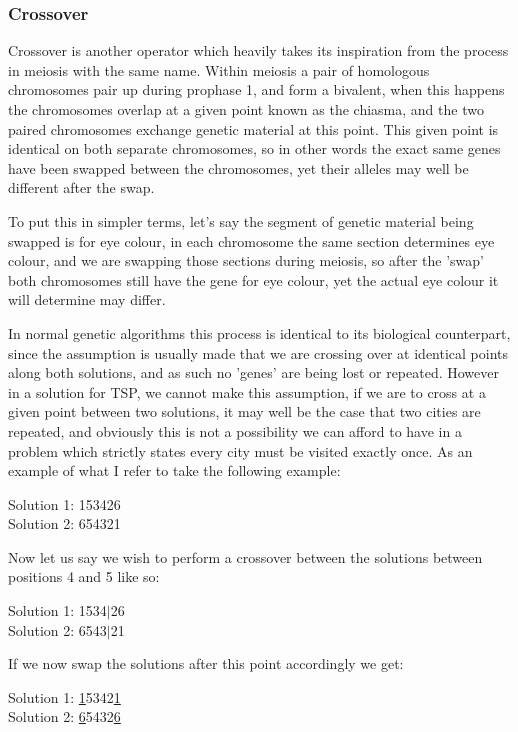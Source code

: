 \documentclass[11pt,a4paper,titlepage]{article}
\begin{document}
\subsubsection{Crossover}

Crossover is another operator which heavily takes its inspiration from the process in meiosis with the same name. Within meiosis a pair of homologous chromosomes pair up during prophase 1, and form a bivalent, when this happens the chromosomes overlap at a given point known as the chiasma, and the two paired chromosomes exchange genetic material at this point. This given point is identical on both separate chromosomes, so in other words the exact same genes have been swapped between the chromosomes, yet their alleles may well be different after the swap.

To put this in simpler terms, let's say the segment of genetic material being swapped is for eye colour, in each chromosome the same section determines eye colour, and we are swapping those sections during meiosis, so after the 'swap' both chromosomes still have the gene for eye colour, yet the actual eye colour it will determine may differ.

In normal genetic algorithms this process is identical to its biological counterpart, since the assumption is usually made that we are crossing over at identical points along both solutions, and as such no 'genes' are being lost or repeated. However in a solution for TSP, we cannot make this assumption, if we are to cross at a given point between two solutions, it may well be the case that two cities are repeated, and obviously this is not a possibility we can afford to have in a problem which strictly states every city must be visited exactly once. As an example of what I refer to take the following example:

\begin{center}\Large
Solution 1: 153426\\
Solution 2: 654321
\end{center}

Now let us say we wish to perform a crossover between the solutions between positions 4 and 5 like so:

\begin{center}\Large
Solution 1: 1534$|$26\\
Solution 2: 6543$|$21
\end{center}

If we now swap the solutions after this point accordingly we get:

\begin{center}\Large
Solution 1: \underline{1}5342\underline{1}\\
Solution 2: \underline{6}5432\underline{6}
\end{center}
\end{document}
